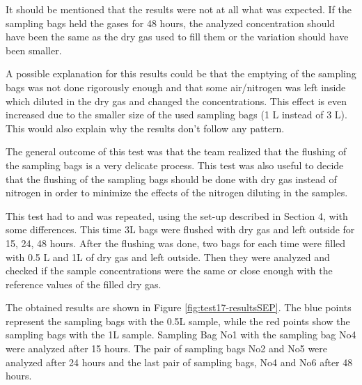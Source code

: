 It should be mentioned that the results were not at all what was expected. If the sampling bags held the gases for 48 hours, the analyzed concentration should have been the same as the dry gas used to fill them or the variation should have been smaller. 

A possible explanation for this results could be that the emptying of the sampling bags was not done rigorously enough and that some air/nitrogen was left inside which diluted in the dry gas and changed the concentrations. This effect is even increased due to the smaller size of the used sampling bags (1 L instead of 3 L). This would also explain why the results don't follow any pattern. 

The general outcome of this test was that the team realized that the flushing of the sampling bags is a very delicate process. This test was also useful to decide that the flushing of the sampling bags should be done with dry gas instead of nitrogen in order to minimize the effects of the nitrogen diluting in the samples. 

This test had to and was repeated, using the set-up described in Section 4, with some differences. This time 3L bags were flushed with dry gas and left outside for 15, 24, 48 hours. After the flushing was done, two bags for each time were filled with 0.5 L and 1L of dry gas and left outside. Then they were analyzed and checked if the sample concentrations were the same or close enough with the reference values of the filled dry gas.

The obtained results are shown in Figure \ref{fig:test17-resultsSEP}. The blue points represent the sampling bags with the 0.5L sample, while the red points show the sampling bags with the 1L sample. Sampling Bag No1 with the sampling bag No4 were analyzed after 15 hours. The pair of sampling bags No2 and No5 were analyzed after 24 hours and the last pair of sampling bags, No4 and No6 after 48 hours.  

